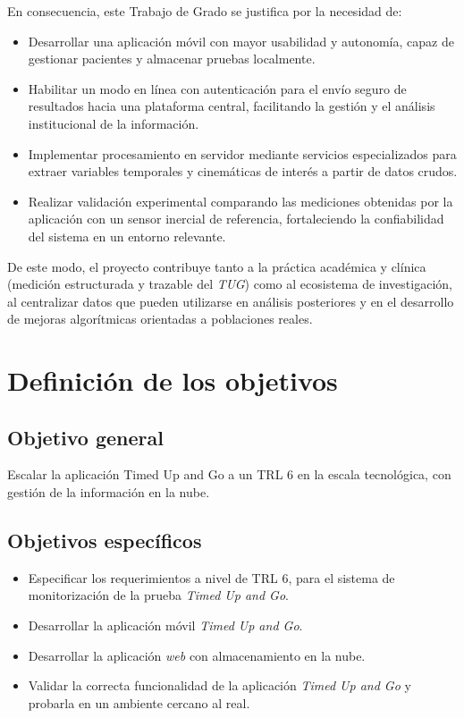 \documentclass[12pt]{report}
\begin{document}
\begin{justify}
    En consecuencia, este Trabajo de Grado se justifica por la necesidad de:
    \begin{itemize}
        \item Desarrollar una aplicación móvil con mayor usabilidad y autonomía, capaz de gestionar pacientes y almacenar pruebas localmente.
        \item Habilitar un modo en línea con autenticación para el envío seguro de resultados hacia una plataforma central, facilitando la gestión y el análisis institucional de la información.
        \item Implementar procesamiento en servidor mediante servicios especializados para extraer variables temporales y cinemáticas de interés a partir de datos crudos.
        \item Realizar validación experimental comparando las mediciones obtenidas por la aplicación con un sensor inercial de referencia, fortaleciendo la confiabilidad del sistema en un entorno relevante.
    \end{itemize}

    De este modo, el proyecto contribuye tanto a la práctica académica y clínica (medición estructurada y trazable del \textit{TUG}) como al ecosistema de investigación, al centralizar datos que pueden utilizarse en análisis posteriores y en el desarrollo de mejoras algorítmicas orientadas a poblaciones reales.\\



    \section{Definición de los objetivos}

    \subsection{Objetivo general}

    Escalar la aplicación Timed Up and Go a un TRL 6 en la escala tecnológica, con gestión de la información en la nube.

    \subsection{Objetivos específicos}

    \begin{itemize}
        \item Especificar los requerimientos a nivel de TRL 6, para el sistema de monitorización de la prueba \textit{Timed Up and Go}.
        \item Desarrollar la aplicación móvil \textit{Timed Up and Go}.
        \item Desarrollar la aplicación \textit{web} con almacenamiento en la nube.
        \item Validar la correcta funcionalidad de la aplicación \textit{Timed Up and Go} y probarla en un ambiente cercano al real.
    \end{itemize}




\end{justify}
\end{document}
